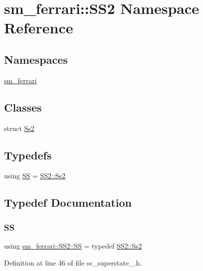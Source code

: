 \hypertarget{namespacesm__ferrari_1_1SS2}{}\section{sm\+\_\+ferrari\+:\+:S\+S2 Namespace Reference}
\label{namespacesm__ferrari_1_1SS2}
\subsection*{Namespaces}
\begin{DoxyCompactItemize}
\item 
 \hyperlink{namespacesm__ferrari_1_1SS2_1_1sm__ferrari}{sm\+\_\+ferrari}
\end{DoxyCompactItemize}
\subsection*{Classes}
\begin{DoxyCompactItemize}
\item 
struct \hyperlink{structsm__ferrari_1_1SS2_1_1Ss2}{Ss2}
\end{DoxyCompactItemize}
\subsection*{Typedefs}
\begin{DoxyCompactItemize}
\item 
using \hyperlink{namespacesm__ferrari_1_1SS2_a2a39eddf62aa2e344161fa4e8140db66}{SS} = \hyperlink{structsm__ferrari_1_1SS2_1_1Ss2}{S\+S2\+::\+Ss2}
\end{DoxyCompactItemize}


\subsection{Typedef Documentation}
\mbox{\label{namespacesm__ferrari_1_1SS2_a2a39eddf62aa2e344161fa4e8140db66}} 
\subsubsection{\texorpdfstring{SS}{SS}}
{\footnotesize\ttfamily using \hyperlink{namespacesm__ferrari_1_1SS2_a2a39eddf62aa2e344161fa4e8140db66}{sm\+\_\+ferrari\+::\+S\+S2\+::\+SS} = typedef \hyperlink{structsm__ferrari_1_1SS2_1_1Ss2}{S\+S2\+::\+Ss2}}



Definition at line 46 of file ss\+\_\+superstate\+\_.\+h.


